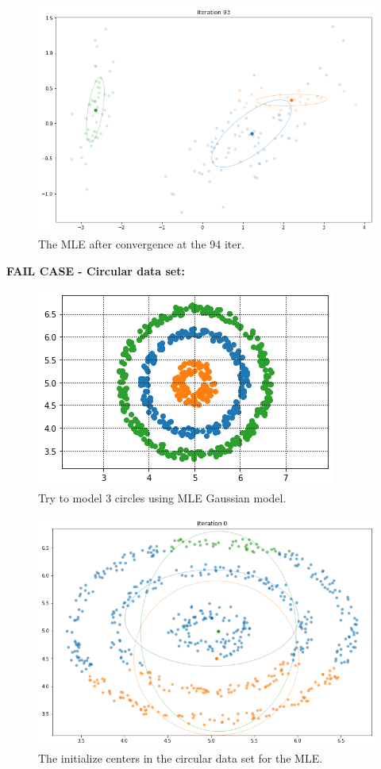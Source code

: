 \documentclass[12pt, a4paper]{paper}
\begin{document}
\begin{figure}[h!]
\centering
\includegraphics[scale=0.3]{iris_PCA_94.png}
\caption{The MLE after convergence at the 94 iter.}
\label{fig:iris_PCA_3}
\end{figure}


\newpage

\textbf{FAIL CASE - Circular data set:}

\begin{figure}[h!]
\centering
\includegraphics[scale=0.5]{circle.png}
\caption{Try to model 3 circles using MLE Gaussian model.}
\label{fig:Circular_1}
\end{figure}

\begin{figure}[h!]
\centering
\includegraphics[scale=0.3]{MLE_cir_iter1.png}
\caption{The initialize centers in the circular data set for the MLE.}
\label{fig:Circular_2}
\end{figure}
\end{document}
